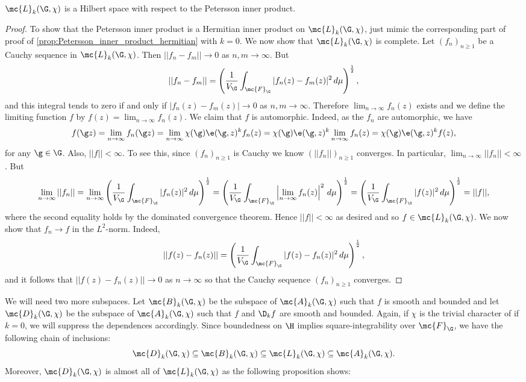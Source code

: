     \begin{proposition}
      $\mc{L}_{k}(\G,\chi)$ is a Hilbert space with respect to the Petersson inner product.
    \end{proposition}
    \begin{proof}
      To show that the Petersson inner product is a Hermitian inner product on $\mc{L}_{k}(\G,\chi)$, just mimic the corresponding part of proof of \cref{prop:Petersson_inner_product_hermitian} with $k = 0$. We now show that $\mc{L}_{k}(\G,\chi)$ is complete. Let $(f_{n})_{n \ge 1}$ be a Cauchy sequence in $\mc{L}_{k}(\G,\chi)$. Then $||f_{n}-f_{m}|| \to 0$ as $n,m \to \infty$. But
      \[
        ||f_{n}-f_{m}|| = \left(\frac{1}{V_{\G}}\int_{\mc{F}_{\G}}|f_{n}(z)-f_{m}(z)|^{2}\,d\mu\right)^{\frac{1}{2}},
      \]
      and this integral tends to zero if and only if $|f_{n}(z)-f_{m}(z)| \to 0$ as $n,m \to \infty$. Therefore $\lim_{n \to \infty}f_{n}(z)$ exists and we define the limiting function $f$ by $f(z) = \lim_{n \to \infty}f_{n}(z)$. We claim that $f$ is automorphic. Indeed, as the $f_{n}$ are automorphic, we have
      \[
        f(\g z) = \lim_{n \to \infty}f_{n}(\g z) = \lim_{n \to \infty}\chi(\g)\e(\g,z)^{k}f_{n}(z) = \chi(\g)\e(\g,z)^{k}\lim_{n \to \infty}f_{n}(z) = \chi(\g)\e(\g,z)^{k}f(z),
      \]
      for any $\g \in \G$. Also, $||f|| < \infty$. To see this, since $(f_{n})_{n \ge 1}$ is Cauchy we know $(||f_{n}||)_{n \ge 1}$ converges. In particular, $\lim_{n \to \infty}||f_{n}|| < \infty$. But
      \[
        \lim_{n \to \infty}||f_{n}|| = \lim_{n \to \infty}\left(\frac{1}{V_{\G}}\int_{\mc{F}_{\G}}|f_{n}(z)|^{2}\,d\mu\right)^{\frac{1}{2}} = \left(\frac{1}{V_{\G}}\int_{\mc{F}_{\G}}\left|\lim_{n \to \infty}f_{n}(z)\right|^{2}\,d\mu\right)^{\frac{1}{2}} = \left(\frac{1}{V_{\G}}\int_{\mc{F}_{\G}}|f(z)|^{2}\,d\mu\right)^{\frac{1}{2}} = ||f||,
      \]
      where the second equality holds by the dominated convergence theorem. Hence $||f|| < \infty$ as desired and so $f \in \mc{L}_{k}(\G,\chi)$. We now show that $f_{n} \to f$ in the $L^{2}$-norm. Indeed,
      \[
        ||f(z)-f_{n}(z)|| = \left(\frac{1}{V_{\G}}\int_{\mc{F}_{\G}}|f(z)-f_{n}(z)|^{2}\,d\mu\right)^{\frac{1}{2}},
      \]
      and it follows that $||f(z)-f_{n}(z)|| \to 0$ as $n \to \infty$ so that the Cauchy sequence $(f_{n})_{n \ge 1}$ converges.
    \end{proof}

    We will need two more subspaces. Let $\mc{B}_{k}(\G,\chi)$ be the subspace of $\mc{A}_{k}(\G,\chi)$ such that $f$ is smooth and bounded and let $\mc{D}_{k}(\G,\chi)$ be the subspace of $\mc{A}_{k}(\G,\chi)$ such that $f$ and $\D_{k}f$ are smooth and bounded. Again, if $\chi$ is the trivial character of if $k = 0$, we will suppress the dependences accordingly. Since boundedness on $\H$ implies square-integrability over $\mc{F}_{\G}$, we have the following chain of inclusions:
    \[
      \mc{D}_{k}(\G,\chi) \subseteq \mc{B}_{k}(\G,\chi) \subseteq \mc{L}_{k}(\G,\chi) \subseteq \mc{A}_{k}(\G,\chi).
    \]
    Moreover, $\mc{D}_{k}(\G,\chi)$ is almost all of $\mc{L}_{k}(\G,\chi)$ as the following proposition shows:

